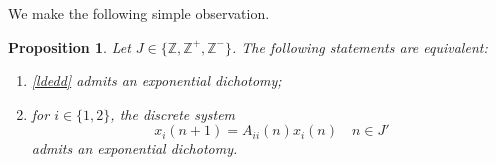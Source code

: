 \documentclass[11pt,reqno,a4paper]{amsart}
\theoremstyle{plain}
\numberwithin{equation}{section}
\newtheorem{proposition}{Proposition}
\newtheorem{lemma}{Lemma}
\theoremstyle{remark}
\def\Z{\mathbb{Z}}
\begin{document}
We make the following simple observation. 
\begin{proposition}\label{newp}
Let $J\in \{\Z, \Z^+, \Z^-\}$. The following statements are equivalent:
\begin{enumerate}
\item \eqref{ldedd} admits an exponential dichotomy;
\item for $i\in \{1, 2\}$, the discrete system 
\begin{equation}\label{iid}
x_i(n+1)=A_{ii}(n)x_i(n) \quad n\in J'
\end{equation}
admits an exponential dichotomy.
\end{enumerate}
\end{proposition}

\end{document}

